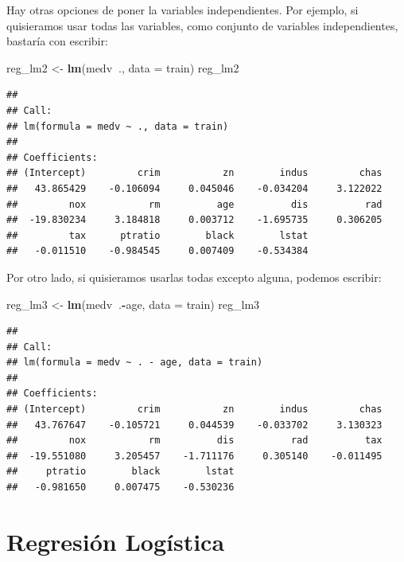 \documentclass[]{book}
\newenvironment{Shaded}{\begin{snugshade}}{\end{snugshade}}
\newcommand{\DataTypeTok}[1]{\textcolor[rgb]{0.13,0.29,0.53}{#1}}
\newcommand{\KeywordTok}[1]{\textcolor[rgb]{0.13,0.29,0.53}{\textbf{#1}}}
\newcommand{\NormalTok}[1]{#1}
\newcommand{\OperatorTok}[1]{\textcolor[rgb]{0.81,0.36,0.00}{\textbf{#1}}}
\newcommand{\StringTok}[1]{\textcolor[rgb]{0.31,0.60,0.02}{#1}}
\begin{document}
Hay otras opciones de poner la variables independientes. Por ejemplo, si quisieramos usar todas las variables, como conjunto de variables independientes, bastaría con escribir:

\begin{Shaded}
\begin{Highlighting}[]
\NormalTok{reg_lm2 <-}\StringTok{ }\KeywordTok{lm}\NormalTok{(medv}\OperatorTok{~}\NormalTok{., }\DataTypeTok{data =}\NormalTok{ train)}
\NormalTok{reg_lm2}
\end{Highlighting}
\end{Shaded}

\begin{verbatim}
## 
## Call:
## lm(formula = medv ~ ., data = train)
## 
## Coefficients:
## (Intercept)         crim           zn        indus         chas  
##   43.865429    -0.106094     0.045046    -0.034204     3.122022  
##         nox           rm          age          dis          rad  
##  -19.830234     3.184818     0.003712    -1.695735     0.306205  
##         tax      ptratio        black        lstat  
##   -0.011510    -0.984545     0.007409    -0.534384
\end{verbatim}

Por otro lado, si quisieramos usarlas todas excepto alguna, podemos escribir:

\begin{Shaded}
\begin{Highlighting}[]
\NormalTok{reg_lm3 <-}\StringTok{ }\KeywordTok{lm}\NormalTok{(medv}\OperatorTok{~}\NormalTok{.}\OperatorTok{-}\NormalTok{age, }\DataTypeTok{data =}\NormalTok{ train)}
\NormalTok{reg_lm3}
\end{Highlighting}
\end{Shaded}

\begin{verbatim}
## 
## Call:
## lm(formula = medv ~ . - age, data = train)
## 
## Coefficients:
## (Intercept)         crim           zn        indus         chas  
##   43.767647    -0.105721     0.044539    -0.033702     3.130323  
##         nox           rm          dis          rad          tax  
##  -19.551080     3.205457    -1.711176     0.305140    -0.011495  
##     ptratio        black        lstat  
##   -0.981650     0.007475    -0.530236
\end{verbatim}

\hypertarget{regresion-logistica}{%
\chapter{Regresión Logística}\label{regresion-logistica}}
\end{document}
